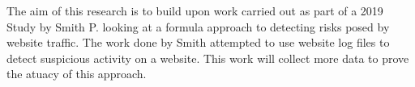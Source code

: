 The aim of this research is to build upon work carried out as part of a 2019 Study by Smith P. looking at a  formula approach to detecting risks posed by website traffic. The work done by Smith attempted to use website log files to detect suspicious activity on a website. This work will collect more data to prove the atuacy of this approach.